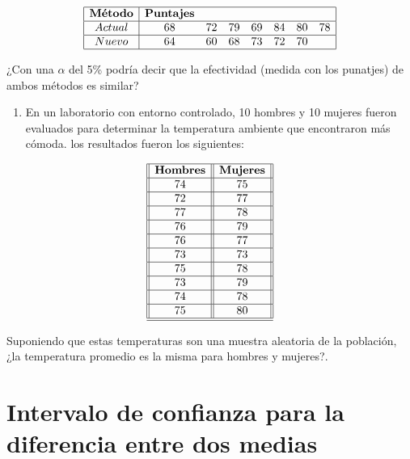 \documentclass[a4paper,oneside,openany]{book}
\providecommand{\tightlist}{%
  \setlength{\itemsep}{0pt}\setlength{\parskip}{0pt}}
\begin{document}
\[
\begin{equation*}
\begin{array}{|c| c c c c c c c|} 
\hline 
\textbf{Método} &\textbf{Puntajes} &&& &&& \\ 
 \hline
Actual & 68 & 72 & 79 & 69 & 84 & 80 & 78 \\ 
 \hline
Nuevo & 64 & 60 & 68 & 73 & 72 & 70& \\ 
\hline
\end{array}
\end{equation*}
\]

¿Con una \(\alpha\) del 5\% podría decir que la efectividad (medida con
los punatjes) de ambos métodos es similar?

\begin{enumerate}
\def\labelenumi{\arabic{enumi}.}
\setcounter{enumi}{1}
\tightlist
\item
  En un laboratorio con entorno controlado, 10 hombres y 10 mujeres
  fueron evaluados para determinar la temperatura ambiente que
  encontraron más cómoda. los resultados fueron los siguientes:
\end{enumerate}

\[
\begin{equation*}
\begin{array}{||c| |c||} 
\hline 
\textbf{Hombres} & \textbf{Mujeres} \\  
 \hline
74&75\\
 \hline
72&77\\
 \hline
77&78\\
 \hline
76&79\\
 \hline
76&77\\
 \hline
73&73\\
 \hline
75&78\\
 \hline
73&79\\
 \hline
74&78\\
 \hline
75&80\\
  \hline
\hline
\end{array}
\end{equation*}
\]

Suponiendo que estas temperaturas son una muestra aleatoria de la
población, ¿la temperatura promedio es la misma para hombres y mujeres?.

\chapter{Intervalo de confianza para la diferencia entre dos
medias}\label{intervalo-de-confianza-para-la-diferencia-entre-dos-medias}
\end{document}
